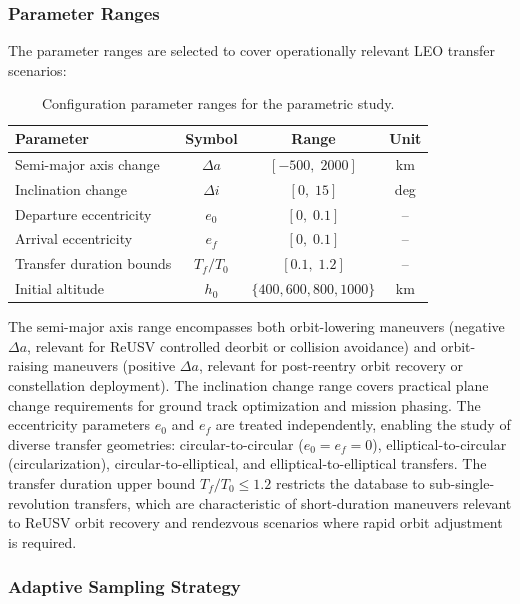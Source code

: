 \documentclass[a4paper,fleqn]{cas-dc}
\begin{document}
\subsubsection{Parameter Ranges}

The parameter ranges are selected to cover operationally relevant LEO transfer scenarios:

\begin{table}[ht]
\centering
\caption{Configuration parameter ranges for the parametric study.}
\label{tab:param_ranges}
\begin{tabular}{lccc}
\hline
Parameter & Symbol & Range & Unit \\
\hline
Semi-major axis change & $\Delta a$ & $[-500,\; 2000]$ & km \\
Inclination change & $\Delta i$ & $[0,\; 15]$ & deg \\
Departure eccentricity & $e_0$ & $[0,\; 0.1]$ & -- \\
Arrival eccentricity & $e_f$ & $[0,\; 0.1]$ & -- \\
Transfer duration bounds & $T_f/T_0$ & $[0.1,\; 1.2]$ & -- \\
Initial altitude & $h_0$ & $\{400, 600, 800, 1000\}$ & km \\
\hline
\end{tabular}
\end{table}

The semi-major axis range encompasses both orbit-lowering maneuvers (negative $\Delta a$, relevant for ReUSV controlled deorbit or collision avoidance) and orbit-raising maneuvers (positive $\Delta a$, relevant for post-reentry orbit recovery or constellation deployment). The inclination change range covers practical plane change requirements for ground track optimization and mission phasing. The eccentricity parameters $e_0$ and $e_f$ are treated independently, enabling the study of diverse transfer geometries: circular-to-circular ($e_0 = e_f = 0$), elliptical-to-circular (circularization), circular-to-elliptical, and elliptical-to-elliptical transfers. The transfer duration upper bound $T_f/T_0 \leq 1.2$ restricts the database to sub-single-revolution transfers, which are characteristic of short-duration maneuvers relevant to ReUSV orbit recovery and rendezvous scenarios where rapid orbit adjustment is required.

\subsubsection{Adaptive Sampling Strategy}
\end{document}
